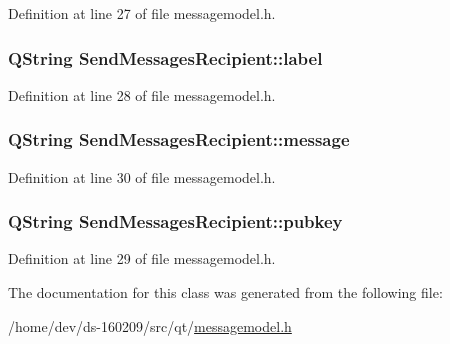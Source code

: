 Definition at line 27 of file messagemodel.\+h.

\hypertarget{class_send_messages_recipient_aebcf95e556030552cd0f5ad5b4901540}{}
\subsubsection[{label}]{\setlength{\rightskip}{0pt plus 5cm}Q\+String Send\+Messages\+Recipient\+::label}\label{class_send_messages_recipient_aebcf95e556030552cd0f5ad5b4901540}


Definition at line 28 of file messagemodel.\+h.

\hypertarget{class_send_messages_recipient_ab6bc9e82b0340b70d8f18897300cf578}{}
\subsubsection[{message}]{\setlength{\rightskip}{0pt plus 5cm}Q\+String Send\+Messages\+Recipient\+::message}\label{class_send_messages_recipient_ab6bc9e82b0340b70d8f18897300cf578}


Definition at line 30 of file messagemodel.\+h.

\hypertarget{class_send_messages_recipient_ae6bb5d8b86ab31f8357f71653286d7ca}{}
\subsubsection[{pubkey}]{\setlength{\rightskip}{0pt plus 5cm}Q\+String Send\+Messages\+Recipient\+::pubkey}\label{class_send_messages_recipient_ae6bb5d8b86ab31f8357f71653286d7ca}


Definition at line 29 of file messagemodel.\+h.



The documentation for this class was generated from the following file\+:\begin{DoxyCompactItemize}
\item 
/home/dev/ds-\/160209/src/qt/\hyperlink{messagemodel_8h}{messagemodel.\+h}\end{DoxyCompactItemize}
